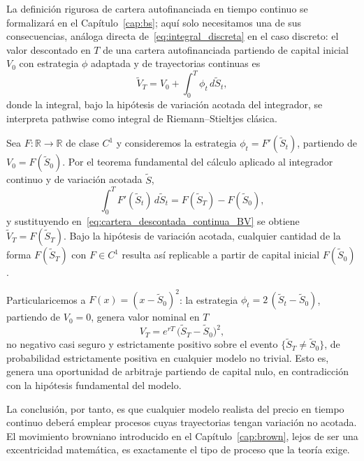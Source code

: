 \documentclass[11pt,a4paper,oneside]{report}
\theoremstyle{plain}
\theoremstyle{definition}
\theoremstyle{remark}
\newcommand{\R}{\mathbb{R}}
\newcommand{\1}{\mathbf{1}}
\begin{document}
La definición rigurosa de cartera autofinanciada en tiempo continuo
se formalizará en el Capítulo~\ref{cap:bs}; aquí solo necesitamos
una de sus consecuencias, análoga directa
de~\eqref{eq:integral_discreta} en el caso discreto: el valor
descontado en $T$ de una cartera autofinanciada partiendo de capital
inicial $V_0$ con estrategia $\phi$ adaptada y de trayectorias
continuas es
\begin{equation}\label{eq:cartera_descontada_continua_BV}
  \widetilde V_T = V_0 + \int_0^T \phi_t\, d\widetilde S_t,
\end{equation}
donde la integral, bajo la hipótesis de variación acotada del
integrador, se interpreta pathwise como integral de
Riemann–Stieltjes clásica.

Sea $F : \R \to \R$ de clase $C^1$ y consideremos la estrategia
$\phi_t = F'(\widetilde S_t)$, partiendo de $V_0 = F(\widetilde S_0)$.
Por el teorema fundamental del cálculo aplicado al integrador
continuo y de variación acotada $\widetilde S$,
\begin{equation*}
  \int_0^T F'(\widetilde S_t)\, d\widetilde S_t
  = F(\widetilde S_T) - F(\widetilde S_0),
\end{equation*}
y sustituyendo en~\eqref{eq:cartera_descontada_continua_BV} se
obtiene $\widetilde V_T = F(\widetilde S_T)$. Bajo la hipótesis de
variación acotada, cualquier cantidad de la forma $F(\widetilde S_T)$
con $F\in C^1$ resulta así replicable a partir de capital inicial
$F(\widetilde S_0)$.

Particularicemos a $F(x) = (x - \widetilde S_0)^2$: la estrategia
$\phi_t = 2\,(\widetilde S_t - \widetilde S_0)$, partiendo de $V_0 =
0$, genera valor nominal en $T$
\begin{equation*}
  V_T = e^{rT}\,\bigl(\widetilde S_T - \widetilde S_0\bigr)^2,
\end{equation*}
no negativo casi seguro y estrictamente positivo sobre el evento
$\{\widetilde S_T \neq \widetilde S_0\}$, de probabilidad
estrictamente positiva en cualquier modelo no trivial. Esto es, genera una
oportunidad de arbitraje partiendo de capital nulo, en
contradicción con la hipótesis fundamental del modelo.

La conclusión, por tanto, es que cualquier modelo realista del precio en
tiempo continuo deberá emplear procesos cuyas trayectorias tengan
variación no acotada. El movimiento browniano introducido en el
Capítulo~\ref{cap:brown}, lejos de ser una excentricidad matemática,
es exactamente el tipo de proceso que la teoría exige.
\end{document}
